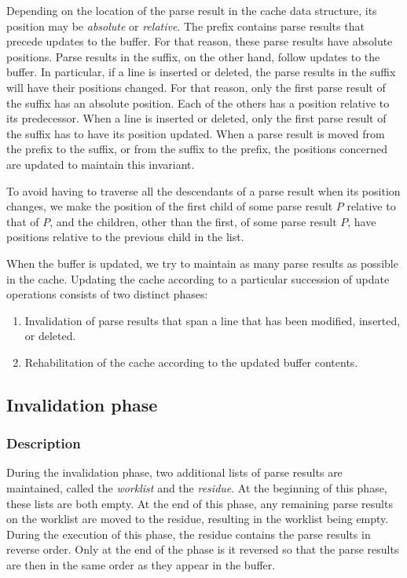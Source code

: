 Depending on the location of the parse result in the cache data
structure, its position may be \emph{absolute} or \emph{relative}.
The prefix contains parse results that precede updates to the buffer.
For that reason, these parse results have absolute positions.  Parse
results in the suffix, on the other hand, follow updates to the
buffer.  In particular, if a line is inserted or deleted, the parse
results in the suffix will have their positions changed.  For that
reason, only the first parse result of the suffix has an absolute
position.  Each of the others has a position relative to its
predecessor.  When a line is inserted or deleted, only the first parse
result of the suffix has to have its position updated.  When a parse
result is moved from the prefix to the suffix, or from the suffix to
the prefix, the positions concerned are updated to maintain this
invariant.

To avoid having to traverse all the descendants of a parse result when
its position changes, we make the position of the first child of some
parse result $P$ relative to that of $P$, and the children, other than
the first, of some parse result $P$, have positions relative to the
previous child in the list.

When the buffer is updated, we try to maintain as many parse results
as possible in the cache.  Updating the cache according to a
particular succession of update operations consists of two distinct
phases:

\begin{enumerate}
\item Invalidation of parse results that span a line that has been
  modified, inserted, or deleted.
\item Rehabilitation of the cache according to the updated buffer
  contents.
\end{enumerate}

\subsection{Invalidation phase}

\subsubsection{Description}

During the invalidation phase, two additional lists of parse results
are maintained, called the \emph{worklist} and the \emph{residue}.  At
the beginning of this phase, these lists are both empty.  At the end
of this phase, any remaining parse results on the worklist are moved
to the residue, resulting in the worklist being empty.  During the
execution of this phase, the residue contains the parse results in
reverse order.  Only at the end of the phase is it reversed so that
the parse results are then in the same order as they appear in the
buffer.

